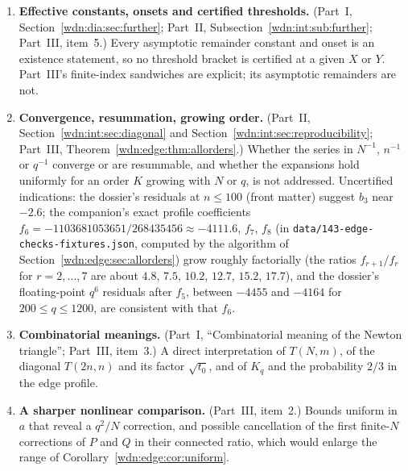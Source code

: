 \documentclass[11pt,letterpaper]{article}
\theoremstyle{remark}\newtheorem{remark}[theorem]{Remark}
\newcommand{\file}[1]{\nolinkurl{#1}}
\begin{document}
\begin{enumerate}[label=\textbf{\arabic*.},ref=\arabic*,leftmargin=*]
\item\label{wdn:q:effective} \textbf{Effective constants, onsets and certified thresholds.} (Part~I, Section~\ref{wdn:dia:sec:further}; Part~II, Subsection~\ref{wdn:int:sub:further}; Part~III, item~5.) Every asymptotic remainder constant and onset is an existence statement, so no threshold bracket is certified at a given $X$ or $Y$. Part~III's finite-index sandwiches are explicit; its asymptotic remainders are not.
\item\label{wdn:q:convergence} \textbf{Convergence, resummation, growing order.} (Part~II, Section~\ref{wdn:int:sec:diagonal} and Section~\ref{wdn:int:sec:reproducibility}; Part~III, Theorem~\ref{wdn:edge:thm:allorders}.) Whether the series in $N^{-1}$, $n^{-1}$ or $q^{-1}$ converge or are resummable, and whether the expansions hold uniformly for an order $K$ growing with $N$ or $q$, is not addressed. Uncertified indications: the dossier's residuals at $n\le100$ (front matter) suggest $b_3$ near $-2.6$; the companion's exact profile coefficients $f_6=-1103681053651/268435456\approx-4111.6$, $f_7$, $f_8$ (in \file{data/143-edge-checks-fixtures.json}, computed by the algorithm of Section~\ref{wdn:edge:sec:allorders}) grow roughly factorially (the ratios $f_{r+1}/f_r$ for $r=2,\ldots,7$ are about $4.8$, $7.5$, $10.2$, $12.7$, $15.2$, $17.7$), and the dossier's floating-point $q^6$ residuals after $f_5$, between $-4455$ and $-4164$ for $200\le q\le1200$, are consistent with that $f_6$.
\item\label{wdn:q:comb} \textbf{Combinatorial meanings.} (Part~I, ``Combinatorial meaning of the Newton triangle''; Part~III, item~3.) A direct interpretation of $T(N,m)$, of the diagonal $T(2n,n)$ and its factor $\sqrt{t_0}$, and of $K_q$ and the probability $2/3$ in the edge profile.
\item\label{wdn:q:sharper} \textbf{A sharper nonlinear comparison.} (Part~III, item~2.) Bounds uniform in $a$ that reveal a $q^2/N$ correction, and possible cancellation of the first finite-$N$ corrections of $P$ and $Q$ in their connected ratio, which would enlarge the range of Corollary~\ref{wdn:edge:cor:uniform}.
\end{enumerate}
\end{document}
